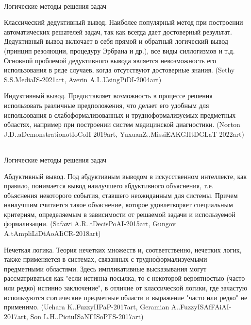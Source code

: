 \begin{frame}{\\Логические методы решения задач}
    \vspace{10mm}
    \begin{scn}
    \begin{textitemize}
        \item Классический дедуктивный вывод. Наиболее популярный метод при построении автоматических решателей задач, так как всегда дает достоверный результат. Дедуктивный вывод включает в себя прямой и обратный логический вывод (принцип резолюции, процедуру Эрбрана и др.), все виды силлогизмов и т.д. Основной проблемой дедуктивного вывода является невозможность его использования в ряде случаев, когда отсутствуют достоверные знания. (Sethy S.S.MediaIS-2021art, Averin A.I..UsingPiDI-2004art)
        \item Индуктивный вывод. Предоставляет возможность в процессе решения использовать различные предположения, что делает его удобным для использования в слабоформализованных и трудноформализуемых предметных областях, например при построении систем медицинской диагностики. (Norton J.D..aDemonstrationotIoCoII-2019art, YuxuanZ..MissiEAKGIItDGLaT-2022art)
    \end{textitemize}
    \end{scn}
\end{frame}
\begin{frame}{\\Логические методы решения задач}
    \vspace{12mm}
    \begin{scn}
    \begin{textitemize}
        \item  Абдуктивный вывод. Под абдуктивным выводом в искусственном интеллекте, как правило, понимается вывод наилучшего абдуктивного объяснения, т.е. объяснения некоторого события, ставшего неожиданным для системы. Причем наилучшим считается такое объяснение, которое удовлетворяет специальным критериям, определяемым в зависимости от решаемой задачи и используемой формализации. (Safawi A.R..tDecisPoAI-2015art, Gungov A.tAmpliLiDtAoAIiCR-2018art)
        \item Нечеткая логика. Теория нечетких множеств и, соответственно, нечетких логик, также применяется в системах, связанных с трудноформализуемыми предметными областями. Здесь импликативные высказывания могут рассматриваться как "если истинна посылка, то с некоторой вероятностью (часто или редко) истинно заключение", в отличие от классической логики, где зачастую используются статические предметные области и выражение "часто или редко" не применимо. (Uehara K..FuzzyIIPaP-2017art, Geramian A..FuzzyISAfFAiAI-2017art, Son L.H..PictuISaNFISoPFS-2017art)
    \end{textitemize}
    \end{scn}
\end{frame}
